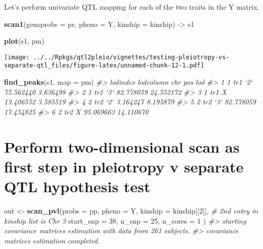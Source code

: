 \documentclass{book}
\newenvironment{Shaded}{\begin{snugshade}}{\end{snugshade}}
\newcommand{\CommentTok}[1]{\textcolor[rgb]{0.56,0.35,0.01}{\textit{#1}}}
\newcommand{\DataTypeTok}[1]{\textcolor[rgb]{0.13,0.29,0.53}{#1}}
\newcommand{\DecValTok}[1]{\textcolor[rgb]{0.00,0.00,0.81}{#1}}
\newcommand{\KeywordTok}[1]{\textcolor[rgb]{0.13,0.29,0.53}{\textbf{#1}}}
\newcommand{\NormalTok}[1]{#1}
\newcommand{\StringTok}[1]{\textcolor[rgb]{0.31,0.60,0.02}{#1}}
\begin{document}
Let's perform univariate QTL mapping for each of the two traits in the Y
matrix.

\begin{Shaded}
\begin{Highlighting}[]
\KeywordTok{scan1}\NormalTok{(}\DataTypeTok{genoprobs =}\NormalTok{ pr, }\DataTypeTok{pheno =}\NormalTok{ Y, }\DataTypeTok{kinship =}\NormalTok{ kinship) ->}\StringTok{ }\NormalTok{s1}
\end{Highlighting}
\end{Shaded}

\begin{Shaded}
\begin{Highlighting}[]
\KeywordTok{plot}\NormalTok{(s1, pm)}
\end{Highlighting}
\end{Shaded}

\texttt{[image: ../../Rpkgs/qtl2pleio/vignettes/testing-pleiotropy-vs-separate-qtl\_files/figure-latex/unnamed-chunk-12-1.pdf]}

\begin{Shaded}
\begin{Highlighting}[]
\KeywordTok{find_peaks}\NormalTok{(s1, }\DataTypeTok{map =}\NormalTok{ pm)}
\CommentTok{#>   lodindex lodcolumn chr       pos       lod}
\CommentTok{#> 1        1       tr1 `2` 75.562440  3.636498}
\CommentTok{#> 2        1       tr1 `3` 82.778059 24.552172}
\CommentTok{#> 3        1       tr1   X 13.406552  3.585519}
\CommentTok{#> 4        2       tr2 `2`  3.164247  8.195879}
\CommentTok{#> 5        2       tr2 `3` 82.778059 17.454825}
\CommentTok{#> 6        2       tr2   X 95.069663 14.110670}
\end{Highlighting}
\end{Shaded}

\hypertarget{perform-two-dimensional-scan-as-first-step-in-pleiotropy-v-separate-qtl-hypothesis-test}{%
\section{Perform two-dimensional scan as first step in pleiotropy v
separate QTL hypothesis
test}\label{perform-two-dimensional-scan-as-first-step-in-pleiotropy-v-separate-qtl-hypothesis-test}}

\begin{Shaded}
\begin{Highlighting}[]
\NormalTok{out <-}\StringTok{ }\KeywordTok{scan_pvl}\NormalTok{(}\DataTypeTok{probs =}\NormalTok{ pp, }
                \DataTypeTok{pheno =}\NormalTok{ Y, }
                \DataTypeTok{kinship =}\NormalTok{ kinship[[}\DecValTok{2}\NormalTok{]], }\CommentTok{# 2nd entry in kinship list is Chr 3}
                \DataTypeTok{start_snp =} \DecValTok{38}\NormalTok{, }
                \DataTypeTok{n_snp =} \DecValTok{25}\NormalTok{, }\DataTypeTok{n_cores =} \DecValTok{1}
\NormalTok{                )}
\CommentTok{#> starting covariance matrices estimation with data from 261 subjects.}
\CommentTok{#> covariance matrices estimation completed.}
\end{Highlighting}
\end{Shaded}
\end{document}
